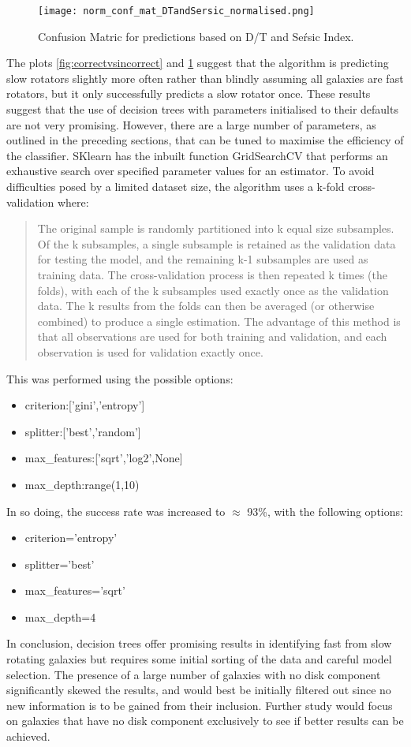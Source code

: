 \begin{figure}[h!]
	\centering
	\texttt{[image: norm\_conf\_mat\_DTandSersic\_normalised.png]}
	\caption{Confusion Matric for predictions based on D/T and Se\'rsic Index.
	}
	\label{fig:confmatDT}
\end{figure}
The plots \ref{fig:correctvsincorrect} and \ref{fig:confmatDT} suggest that the algorithm is predicting slow rotators slightly more often rather than blindly assuming all galaxies are fast rotators, but it only successfully predicts a slow rotator once.
These results suggest that the use of decision trees with parameters initialised to their defaults are not very promising. However, there are a large number of parameters, as outlined in the preceding sections, that can be tuned to maximise the efficiency of the classifier. SKlearn has the inbuilt function GridSearchCV that performs an exhaustive search over specified parameter values for an estimator. To avoid difficulties posed by a limited dataset size, the algorithm uses a k-fold cross-validation where:
\begin{quotation}
	The original sample is randomly partitioned into k equal size subsamples. Of the k subsamples, a single subsample is retained as the validation data for testing the model, and the remaining k-1 subsamples are used as training data. The cross-validation process is then repeated k times (the folds), with each of the k subsamples used exactly once as the validation data. The k results from the folds can then be averaged (or otherwise combined) to produce a single estimation. The advantage of this method is that all observations are used for both training and validation, and each observation is used for validation exactly once.\cite{vanschoren}
\end{quotation}
This was performed using the possible options:
\begin{itemize}
	\item criterion:['gini','entropy']
	\item splitter:['best','random']
	\item max\_features:['sqrt','log2',None]
	\item max\_depth:range(1,10)
\end{itemize}
In so doing, the success rate was increased to $\approx$ 93\%, with the following options:
\begin{itemize}
	\item criterion='entropy'
	\item splitter='best'
	\item max\_features='sqrt'
	\item max\_depth=4
\end{itemize}
In conclusion, decision trees offer promising results in identifying fast from slow rotating galaxies but requires some initial sorting of the data and careful model selection. The presence of a large number of galaxies with no disk component significantly skewed the results, and would best be initially filtered out since no new information is to be gained from their inclusion. Further study would focus on galaxies that have no disk component exclusively to see if better results can be achieved.